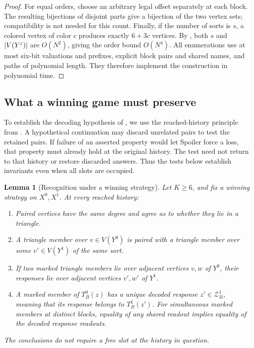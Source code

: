 \documentclass[11pt]{article}
\newtheorem{lemma}[theorem]{Lemma}
\theoremstyle{definition}
\newcommand{\cZ}{\mathcal Z}
\newcommand{\eps}{\varepsilon}
\DeclarePairedDelimiter{\abs}{\lvert}{\rvert}
\begin{document}
\begin{proof}
For equal orders, choose an arbitrary legal offset separately at each
block.  The resulting bijections of disjoint parts give a bijection
of the two vertex sets; compatibility is not needed for this count.
Finally, if the number of sorts is \(s\), a colored vertex of color
\(c\) produces exactly \(6+3c\) vertices.
By , both \(s\) and \(\abs{V(Y^\eps)}\)
are \(O(N^2)\), giving the order bound \(O(N^4)\).
All enumerations use at most six-bit valuations and prefixes, explicit
block pairs and shared names, and paths of polynomial length.
They therefore implement the construction in polynomial time.
\end{proof}

\subsection{What a winning game must preserve}

To establish the decoding hypothesis of ,
we use the reached-history principle from .
A hypothetical continuation may discard unrelated pairs to test the
retained pairs. If failure of an asserted property would let Spoiler
force a loss, that property must already hold at the original history.
The test need not return to that history or restore discarded answers.
Thus the tests below establish invariants even when all slots are occupied.

\begin{lemma}[Recognition under a winning strategy]
\label{lem:graph-recognition}
Let \(K\ge6\), and fix a winning strategy on \(X^0,X^1\).
At every reached history:
\begin{enumerate}
\item
Paired vertices have the same degree and agree as to whether they lie
in a triangle.
\item
A triangle member over \(v\in V(Y^0)\) is paired with a triangle
member over some \(v'\in V(Y^1)\) of the same sort.
\item
If two marked triangle members lie over adjacent vertices \(v,w\)
of \(Y^0\), their responses lie over adjacent vertices \(v',w'\)
of \(Y^1\).
\item
A marked member of \(T_B^0(z)\) has a unique decoded response
\(z'\in\cZ_B^1\), meaning that its response belongs to \(T_B^1(z')\).
For simultaneous marked members at distinct blocks, equality of any
shared readout implies equality of the decoded response readouts.
\end{enumerate}
The conclusions do not require a free slot at the history in question.
\end{lemma}
\end{document}
